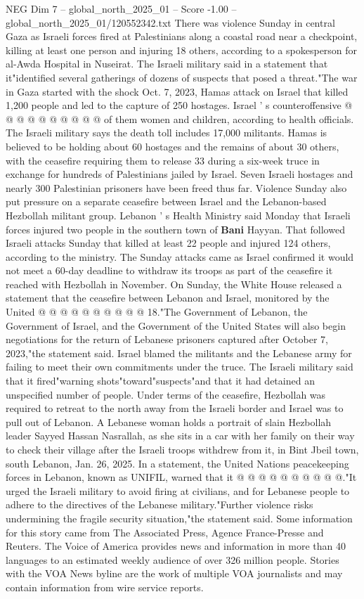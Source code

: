 \begin{textsample}{NEG Dim 7 – global\_north\_2025\_01 – Score -1.00 – global\_north\_2025\_01/120552342.txt}
There was violence Sunday in central Gaza as Israeli forces fired at Palestinians along a coastal road near a checkpoint, killing at least one person and injuring 18 others, according to a spokesperson for al-Awda Hospital in Nuseirat.
The Israeli military said in a statement that it"identified several gatherings of dozens of suspects that posed a threat."The war in Gaza started with the shock Oct. 7, 2023, Hamas attack on Israel that killed 1,200 people and led to the capture of 250 hostages.
Israel ' s counteroffensive @ @ @ @ @ @ @ @ @ @ of them women and children, according to health officials.
The Israeli military says the death toll includes 17,000 militants.
Hamas is believed to be holding about 60 hostages and the remains of about 30 others, with the ceasefire requiring them to release 33 during a six-week truce in exchange for hundreds of Palestinians jailed by Israel.
Seven Israeli hostages and nearly 300 Palestinian prisoners have been freed thus far.
Violence Sunday also put pressure on a separate ceasefire between Israel and the Lebanon-based Hezbollah militant group.
Lebanon ' s Health Ministry said Monday that Israeli forces injured two people in the southern town of \textbf{Bani} Hayyan.
That followed Israeli attacks Sunday that killed at least 22 people and injured 124 others, according to the ministry.
The Sunday attacks came as Israel confirmed it would not meet a 60-day deadline to withdraw its troops as part of the ceasefire it reached with Hezbollah in November.
On Sunday, the White House released a statement that the ceasefire between Lebanon and Israel, monitored by the United @ @ @ @ @ @ @ @ @ @ 18."The Government of Lebanon, the Government of Israel, and the Government of the United States will also begin negotiations for the return of Lebanese prisoners captured after October 7, 2023,"the statement said.
Israel blamed the militants and the Lebanese army for failing to meet their own commitments under the truce.
The Israeli military said that it fired"warning shots"toward"suspects"and that it had detained an unspecified number of people.
Under terms of the ceasefire, Hezbollah was required to retreat to the north away from the Israeli border and Israel was to pull out of Lebanon.
A Lebanese woman holds a portrait of slain Hezbollah leader Sayyed Hassan Nasrallah, as she sits in a car with her family on their way to check their village after the Israeli troops withdrew from it, in Bint Jbeil town, south Lebanon, Jan. 26, 2025.
In a statement, the United Nations peacekeeping forces in Lebanon, known as UNIFIL, warned that it @ @ @ @ @ @ @ @ @ @."It urged the Israeli military to avoid firing at civilians, and for Lebanese people to adhere to the directives of the Lebanese military."Further violence risks undermining the fragile security situation,"the statement said.
Some information for this story came from The Associated Press, Agence France-Presse and Reuters.
The Voice of America provides news and information in more than 40 languages to an estimated weekly audience of over 326 million people.
Stories with the VOA News byline are the work of multiple VOA journalists and may contain information from wire service reports.

\end{textsample}
